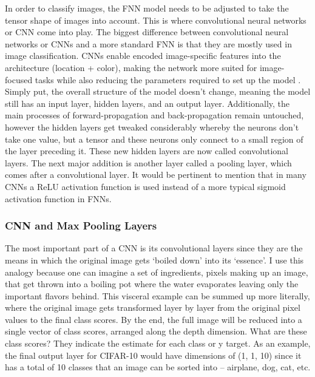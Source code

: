 \documentclass[12pt]{article}
\begin{document}
                In order to classify images, the FNN model needs to be adjusted to take the tensor shape of images into account. 
                This is where convolutional neural networks or CNN come into play. 
                The biggest difference between convolutional neural networks 
                or CNNs and a more standard FNN is that they are mostly used in image classification. 
                CNNs enable encoded image-specific features into the architecture (location + color), 
                making the network more suited for image-focused tasks 
                while also reducing the parameters required to set up the model \cite{oshea2015}. 
                Simply put, the overall structure of the model doesn’t change, 
                meaning the model still has an input layer, hidden layers, and an output layer. 
                Additionally, the main processes of forward-propagation and back-propagation remain untouched, 
                however the hidden layers get tweaked considerably whereby the neurons don’t take one value, 
                but a tensor and these neurons only connect to a small region of the layer preceding it. 
                These new hidden layers are now called convolutional layers. 
                The next major addition is another layer called a pooling layer, which comes after a convolutional layer. 
                It would be pertinent to mention that in many CNNs a ReLU activation function is used 
                instead of a more typical sigmoid activation function in FNNs.
            
            \subsubsection{CNN and Max Pooling Layers}


                The most important part of a CNN is its convolutional layers 
                since they are the means in which the original image gets ‘boiled down’ into its ‘essence’. 
                I use this analogy because one can imagine a set of ingredients, pixels making up an image, 
                that get thrown into a boiling pot where the water evaporates leaving only the important flavors behind. 
                This visceral example can be summed up more literally, 
                where the original image gets transformed layer by layer from the original pixel values to the final class scores. 
                By the end, the full image will be reduced into a single vector of class scores, arranged along the depth dimension. 
                What are these class scores? They indicate the estimate for each class or y target. 
                As an example, the final output layer for CIFAR-10 would have dimensions of (1, 1, 10) 
                since it has a total of 10 classes that an image can be sorted into \cite{cs231n2023} -- airplane, dog, cat, etc.
\end{document}
